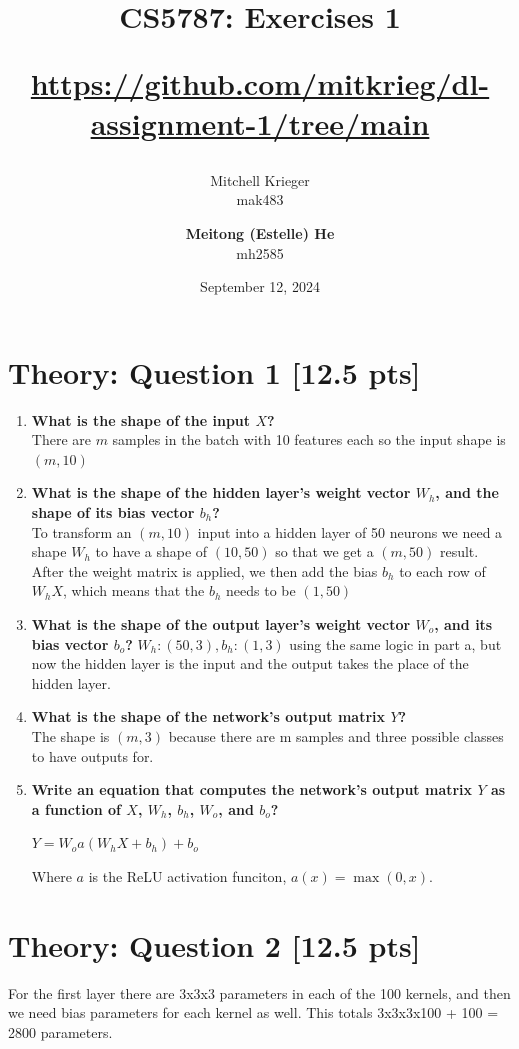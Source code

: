 \documentclass{article}
\title{CS5787: Exercises 1 \\ \begin{small}\url{https://github.com/mitkrieg/dl-assignment-1/tree/main}\end{small}}
\author{Mitchell Krieger \\ mak483 \and \textbf{Meitong (Estelle) He} \\ mh2585}
\date{September 12, 2024}
\begin{document}
\maketitle

\section{Theory: Question 1 [12.5 pts]}

\begin{enumerate}[label=\alph*.]
    \item \textbf{What is the shape of the input $X$?} \\ There are $m$ samples in the batch with 10 features each so the input shape is $(m, 10)$ 
    \item \textbf{What is the shape of the hidden layer's weight vector $W_h$, and the shape of its bias vector $b_h$?} \\ To transform an $(m, 10)$ input into a hidden layer of 50 neurons we need a shape $W_h$ to have a shape of $(10, 50)$ so that we get a $(m, 50)$ result. After the weight matrix is applied, we then add the bias $b_h$ to each row of $W_hX$, which means that the $b_h$ needs to be $(1, 50)$
    \item \textbf{What is the shape of the output layer's weight vector $W_o$, and its bias vector $b_o$?} $W_h: (50, 3), b_h: (1, 3)$ using the same logic in part a, but now the hidden layer is the input and the output takes the place of the hidden layer.
    \item \textbf{What is the shape of the network's output matrix $Y$?} \\ The shape is $(m, 3)$ because there are m samples and three possible classes to have outputs for.
    \item \textbf{Write an equation that computes the network's output matrix $Y$ as a function of $X$, $W_h$, $b_h$, $W_o$, and $b_o$?}
    
          $Y = W_oa(W_hX+b_h)+b_o$ 

          Where $a$ is the ReLU activation funciton, $a(x) = \max(0,x)$.
\end{enumerate}

\section{Theory: Question 2 [12.5 pts]}

For the first layer there are 3x3x3 parameters in each of the 100 kernels, and then we need bias parameters for each kernel as well. This totals 3x3x3x100 + 100 = 2800 parameters. 
\end{document}
